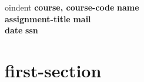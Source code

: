 \documentclass[a4paper, 11pt]{article}
\begin{document}
oindent
\large\textbf{course, course-code} \hfill \textbf{name} \\
\large\textbf{assignment-title} \hfill \textbf{mail} \\
\large\textbf{date} \hfill \textbf{ssn}

\section*{first-section}


\end{document}

